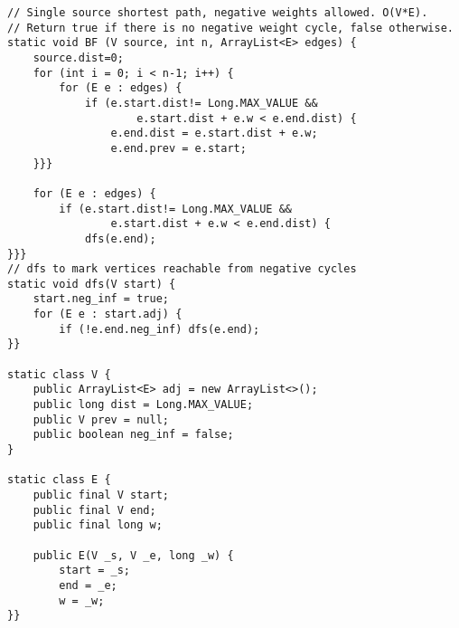 \begin{verbatim}
// Single source shortest path, negative weights allowed. O(V*E).
// Return true if there is no negative weight cycle, false otherwise.
static void BF (V source, int n, ArrayList<E> edges) {
	source.dist=0;
	for (int i = 0; i < n-1; i++) {
		for (E e : edges) {
			if (e.start.dist!= Long.MAX_VALUE && 
					e.start.dist + e.w < e.end.dist) {
				e.end.dist = e.start.dist + e.w;
				e.end.prev = e.start;
	}}}
		
	for (E e : edges) {
		if (e.start.dist!= Long.MAX_VALUE && 
				e.start.dist + e.w < e.end.dist) {
			dfs(e.end);
}}}	
// dfs to mark vertices reachable from negative cycles
static void dfs(V start) {
	start.neg_inf = true;
	for (E e : start.adj) {
		if (!e.end.neg_inf) dfs(e.end);
}}

static class V {
	public ArrayList<E> adj = new ArrayList<>();
	public long dist = Long.MAX_VALUE;
	public V prev = null;
	public boolean neg_inf = false;
}
	
static class E {
	public final V start;
	public final V end;
	public final long w;

	public E(V _s, V _e, long _w) {
		start = _s;
		end = _e;
		w = _w;
}}
\end{verbatim}